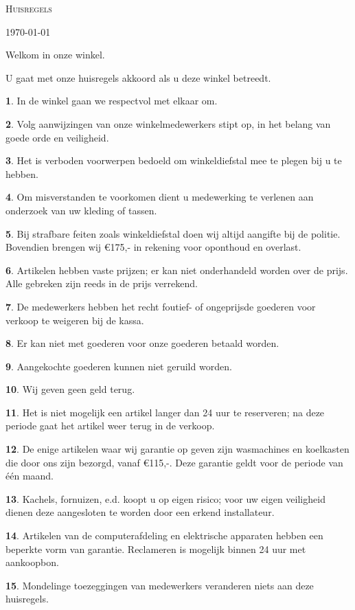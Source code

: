 \documentclass[a4paper,14pt]{extarticle}
\theoremstyle{definition}
\newtheorem{regel}{}
\begin{document}
\thispagestyle{empty}
\centerline{\LARGE\textsc{Huisregels}}
\centerline{\today}
\vskip 0.5cm
\centerline{Welkom in onze winkel.} 
\centerline{U gaat met onze huisregels akkoord als u deze winkel betreedt.}
\vskip 1cm

\begin{regel}
In de winkel gaan we respectvol met elkaar om.
\end{regel}
\begin{regel}
Volg aanwijzingen van onze winkelmedewerkers stipt op, in het belang van goede orde en veiligheid.
\end{regel}
\begin{regel}
Het is verboden voorwerpen bedoeld om winkeldiefstal mee te plegen bij u te hebben.
\end{regel}
\begin{regel}
Om misverstanden te voorkomen dient u medewerking te verlenen aan onderzoek van uw kleding of tassen.
\end{regel}
\begin{regel}
Bij strafbare feiten zoals winkeldiefstal doen wij altijd aangifte bij de politie. Bovendien brengen wij \euro 175,- in rekening voor oponthoud en overlast. 
\end{regel}
\begin{regel}
Artikelen hebben vaste prijzen; er kan niet onderhandeld worden over de prijs. Alle gebreken zijn reeds in de prijs verrekend.
\end{regel}
\begin{regel}
De medewerkers hebben het recht foutief- of ongeprijsde goederen voor verkoop te weigeren bij de kassa.
\end{regel}
\begin{regel}
Er kan niet met goederen voor onze goederen betaald worden.
\end{regel}
\begin{regel}
Aangekochte goederen kunnen niet geruild worden.
\end{regel}
\begin{regel}
Wij geven geen geld terug.
\end{regel}
\begin{regel}
Het is niet mogelijk een artikel langer dan 24 uur te reserveren; na deze periode gaat het artikel weer terug in de verkoop.
\end{regel}
\begin{regel}
De enige artikelen waar wij garantie op geven zijn wasmachines en koelkasten die door ons zijn bezorgd, vanaf \euro 115,-. Deze garantie geldt voor de periode van \'{e}\'{e}n maand. 
\end{regel}
\begin{regel}
Kachels, fornuizen, e.d. koopt u op eigen risico; voor uw eigen veiligheid dienen deze aangesloten te worden door een erkend installateur.
\end{regel}
\begin{regel}
Artikelen van de computerafdeling en elektrische apparaten hebben een beperkte vorm van garantie. Reclameren is mogelijk binnen 24 uur met aankoopbon.
\end{regel}
\begin{regel}
Mondelinge toezeggingen van medewerkers veranderen niets aan deze huisregels.
\end{regel}
\end{document}
